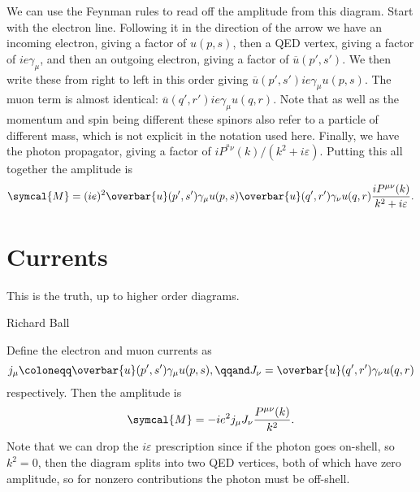 \documentclass[fleqn]{NotesClass}
\newcommand{\amplitude}{\symcal{M}}
\newcommand{\diracadjoint}[1]{\overbar{#1}}
\begin{document}
    We can use the Feynman rules to read off the amplitude from this diagram.
    Start with the electron line.
    Following it in the direction of the arrow we have an incoming electron, giving a factor of \(u(p, s)\), then a QED vertex, giving a factor of \(ie\gamma_\mu\), and then an outgoing electron, giving a factor of \(\diracadjoint{u}(p', s')\).
    We then write these from right to left in this order giving \(\diracadjoint{u}(p', s') ie\gamma_\mu u(p, s)\).
    The muon term is almost identical: \(\diracadjoint{u}(q', r') ie\gamma_\mu u(q, r)\).
    Note that as well as the momentum and spin being different these spinors also refer to a particle of different mass, which is not explicit in the notation used here.
    Finally, we have the photon propagator, giving a factor of \(iP^{^\mu\nu}(k)/(k^2 + i\varepsilon)\).
    Putting this all together the amplitude is
    \begin{equation}
        \amplitude = (ie)^2 \diracadjoint{u}(p', s') \gamma_\mu u(p, s) \diracadjoint{u}(q', r') \gamma_\nu u(q, r) \frac{iP^{\mu\nu}(k)}{k^2 + i\varepsilon}.
    \end{equation}
    
    \section{Currents}
    \epigraph{This is the truth, up to higher order diagrams.}{Richard Ball}
    Define the electron and muon currents as
    \begin{equation}
        j_\mu \coloneqq \diracadjoint{u}(p', s') \gamma_\mu u(p, s), \qqand J_\nu = \diracadjoint{u}(q', r') \gamma_\nu u(q, r)
    \end{equation}
    respectively.
    Then the amplitude is
    \begin{equation}
        \amplitude = -ie^2 j_\mu J_\nu \frac{P^{\mu\nu}(k)}{k^2}.
    \end{equation}
    Note that we can drop the \(i\varepsilon\) prescription since if the photon goes on-shell, so \(k^2 = 0\), then the diagram splits into two QED vertices, both of which have zero amplitude, so for nonzero contributions the photon must be off-shell.
    
\end{document}
